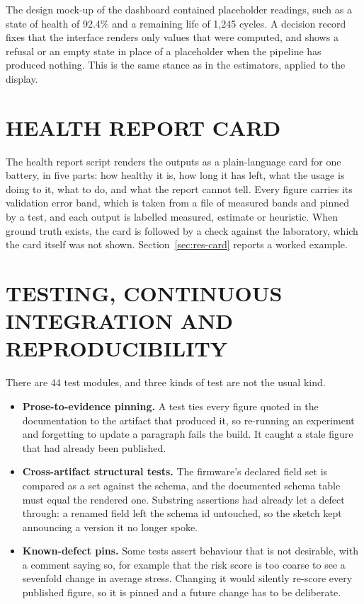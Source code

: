 The design mock-up of the dashboard contained placeholder readings, such as a state of health of 92.4\% and a remaining life of 1,245 cycles. A decision record fixes that the interface renders only values that were computed, and shows a refusal or an empty state in place of a placeholder when the pipeline has produced nothing. This is the same stance as in the estimators, applied to the display.

\section{HEALTH REPORT CARD}
\label{sec:impl-card}

The health report script renders the outputs as a plain-language card for one battery, in five parts: how healthy it is, how long it has left, what the usage is doing to it, what to do, and what the report cannot tell. Every figure carries its validation error band, which is taken from a file of measured bands and pinned by a test, and each output is labelled measured, estimate or heuristic. When ground truth exists, the card is followed by a check against the laboratory, which the card itself was not shown. Section~\ref{sec:res-card} reports a worked example.

\section{TESTING, CONTINUOUS INTEGRATION AND REPRODUCIBILITY}
\label{sec:impl-test}

There are 44 test modules, and three kinds of test are not the usual kind.

\begin{itemize}
    \item \textbf{Prose-to-evidence pinning.} A test ties every figure quoted in the documentation to the artifact that produced it, so re-running an experiment and forgetting to update a paragraph fails the build. It caught a stale figure that had already been published.
    \item \textbf{Cross-artifact structural tests.} The firmware's declared field set is compared as a set against the schema, and the documented schema table must equal the rendered one. Substring assertions had already let a defect through: a renamed field left the schema id untouched, so the sketch kept announcing a version it no longer spoke.
    \item \textbf{Known-defect pins.} Some tests assert behaviour that is not desirable, with a comment saying so, for example that the risk score is too coarse to see a sevenfold change in average stress. Changing it would silently re-score every published figure, so it is pinned and a future change has to be deliberate.
\end{itemize}

